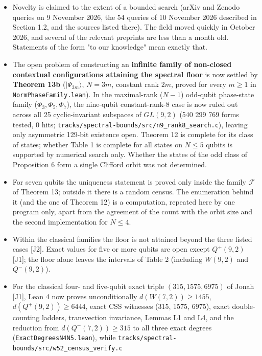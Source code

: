 \documentclass[11pt,a4paper]{article}
\providecommand{\tightlist}{\setlength{\itemsep}{0pt}\setlength{\parskip}{0pt}}
\begin{document}
\begin{itemize}
\tightlist
\item
  Novelty is claimed to the extent of a bounded search (arXiv and Zenodo queries on 9 November 2026,
  the 54 queries of 10 November 2026 described in Section 1.2, and the sources listed there). The field
  moved quickly in October 2026, and several of the relevant preprints are less than a month old.
  Statements of the form "to our knowledge" mean exactly that.
\item
  The open problem of constructing an \textbf{infinite family of non-closed contextual configurations attaining
  the spectral floor} is now settled by \textbf{Theorem 13b} (\(|\Psi_{3m}\rangle\), \(N=3m\), constant rank \(2m\),
  proved for every \(m\ge1\) in \nolinkurl{NormPhaseFamily.lean}). In the maximal-rank (\(N-1\)) odd-qubit phase-state
  family (\(\Phi_3, \Phi_5, \Phi_7\)), the nine-qubit constant-rank-8 case is now ruled out across all 25
  cyclic-invariant subspaces of \(GL(9,2)\) (540 299 769 forms tested, 0 hits; \nolinkurl{tracks/spectral-bounds/src/n9_rank8_search.c}),
  leaving only asymmetric 129-bit existence open. Theorem 12 is complete for its class of states; whether
  Table 1 is complete for all states on \(N \le 5\) qubits is supported by numerical search only. Whether
  the states of the odd class of Proposition 6 form a single Clifford orbit was not determined.
\item
  For seven qubits the uniqueness statement is proved only inside the family \(\mathcal{F}\) of
  Theorem 13; outside it there is a random census. The enumeration behind it (and the one of
  Theorem 12) is a computation, repeated here by one program only, apart from the agreement of the
  count with the orbit size and the second implementation for \(N \le 4\).
\item
  Within the classical families the floor is not attained beyond the three listed cases {[}J2{]}. Exact
  values for five or more qubits are open except \(Q^+(9,2)\) {[}J1{]}; the floor alone leaves the intervals
  of Table 2 (including \(W(9,2)\) and \(Q^-(9,2)\)).
\item
  For the classical four- and five-qubit exact triple \((315, 1575, 6975)\) of Jonah {[}J1{]}, Lean 4 now
  proves unconditionally \(d(W(7,2)) \ge 1455\), \(d(Q^+(9,2)) \ge 6444\), exact CSS witnesses (315, 1575,
  6975), exact double-counting ladders, transvection invariance, Lemmas L1 and L4, and the reduction from
  \(d(Q^-(7,2)) \ge 315\) to all three exact degrees (\nolinkurl{ExactDegreesN4N5.lean}), while \nolinkurl{tracks/spectral-bounds/src/w52_census_verify.c}

\end{itemize}
\end{document}
